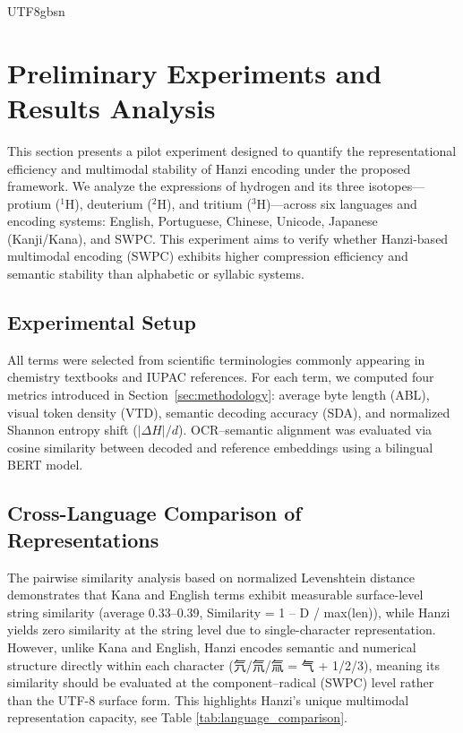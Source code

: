 \documentclass[conference]{IEEEtran}
\begin{document}
\begin{CJK*}{UTF8}{gbsn}
\section{Preliminary Experiments and Results Analysis}
\label{sec:results}

This section presents a pilot experiment designed to quantify the representational efficiency and multimodal stability of Hanzi encoding under the proposed framework.  
We analyze the expressions of hydrogen and its three isotopes—protium ($^{1}$H), deuterium ($^{2}$H), and tritium ($^{3}$H)—across six languages and encoding systems: English, Portuguese, Chinese, Unicode, Japanese (Kanji/Kana), and SWPC.  
This experiment aims to verify whether Hanzi-based multimodal encoding (SWPC) exhibits higher compression efficiency and semantic stability than alphabetic or syllabic systems.

\subsection{Experimental Setup}

All terms were selected from scientific terminologies commonly appearing in chemistry textbooks and IUPAC references.  
For each term, we computed four metrics introduced in Section~\ref{sec:methodology}:  
average byte length (ABL), visual token density (VTD), semantic decoding accuracy (SDA), and normalized Shannon entropy shift ($|\Delta H|/d$).  
OCR–semantic alignment was evaluated via cosine similarity between decoded and reference embeddings using a bilingual BERT model.

\subsection{Cross-Language Comparison of Representations}
The pairwise similarity analysis based on normalized Levenshtein distance
demonstrates that Kana and English terms exhibit measurable surface-level
string similarity (average 0.33–0.39, Similarity = 1 – D / max(len)), while Hanzi yields zero similarity at the
string level due to single-character representation. However, unlike Kana and
English, Hanzi encodes semantic and numerical structure directly within each
character (氕/氘/氚 = 气 + 1/2/3), meaning its similarity should be evaluated
at the component–radical (SWPC) level rather than the UTF-8 surface form.
This highlights Hanzi's unique multimodal representation capacity, see Table \ref{tab:language_comparison}.


\end{CJK*}
\end{document}
